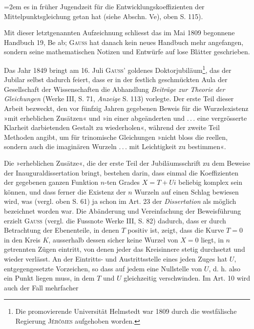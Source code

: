 \clearpage{}
\begingroup\leftskip=2em\noindent
es in früher Jugendzeit für die Entwicklungskoeffizienten der Mittelpunktsgleichung
getan hat (siehe Abschn. Ve), oben S. 115).\par\endgroup
\noindent Mit dieser letztgenannten Aufzeichnung schliesst das im Mai 1809 begonnene
Handbuch 19, Be ab; \textsc{Gauss} hat danach kein neues Handbuch mehr angefangen,
sondern seine mathematischen Notizen und Entwürfe auf lose Blätter
geschrieben.
\par
Das Jahr 1849 bringt am 16. Juli \textsc{Gauss'} goldenes Doktorjubiläum\footnote{Die promovierende Universität Helmstedt war 1809 durch die westfälische Regierung \textsc{Jérômes} aufgehoben worden.},
das der Jubilar selbst dadurch feiert, dass er in der festlich geschmückten
Aula der Gesellschaft der Wissenschaften die Abhandlung \textit{Beiträge zur Theorie
der Gleichungen} (Werke III, S. 71, \textit{Anzeige} S. 113) vorlegte. Der erste Teil
dieser Arbeit bezweckt, den vor fünfzig Jahren gegebenen Beweis für die
Wurzelexistenz »mit erheblichen Zusätzen« und »in einer abgeänderten und
\mbox{.\,.\,.} eine vergrösserte Klarheit darbietenden Gestalt zu wiederholen«, während
der zweite Teil Methoden angibt, um für trinomische Gleichungen »nicht
bloss die reellen, sondern auch die imaginären Wurzeln \mbox{.\,.\,.} mit Leichtigkeit
zu bestimmen«.
\par
Die »erheblichen Zusätze«, die der erste Teil der Jubiläumsschrift zu dem
Beweise der Inauguraldissertation bringt, bestehen darin, dass einmal die Koeffizienten
der gegebenen ganzen Funktion \(n\)-ten Grades \(X=T+Ui\) beliebig
komplex sein können, und dass ferner die Existenz der \(n\) Wurzeln auf einen
Schlag bewiesen wird, was (vergl. oben S. 61) ja schon im Art. 23 der \textit{Dissertation}
als möglich bezeichnet worden war. Die Abänderung und Vereinfachung
der Beweisführung erzielt \textsc{Gauss} (vergl. die Fussnote Werke III, S. 82)
dadurch, dass er durch Betrachtung der Ebenenteile, in denen \(T\) positiv ist,
zeigt, dass die Kurve \(T=0\) in den Kreis \(K\), ausserhalb dessen sicher keine
Wurzel von \(X=0\) liegt, in \(n\) getrennten Zügen eintritt, von denen jeder
das Kreisinnere stetig durchsetzt und wieder verlässt. An der Eintritts- und
Austrittsstelle eines jeden Zuges hat \(U\), entgegengesetzte Vorzeichen, so dass
auf jedem eine Nullstelle von \(U\), d. h. also ein Punkt liegen muss, in dem \(T\)
und \(U\) gleichzeitig verschwinden. Im Art. 10 wird auch der Fall mehrfacher

